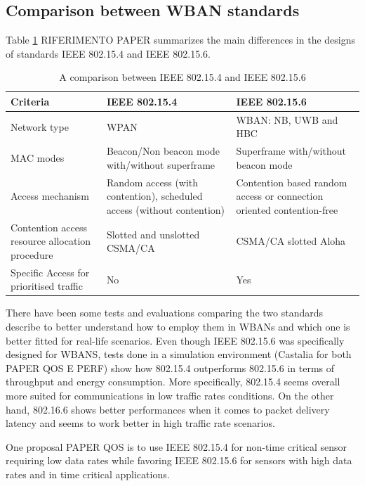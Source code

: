 \documentclass[conference]{IEEEtran}
\begin{document}
\subsection{Comparison between WBAN standards}
Table \ref{tab2} RIFERIMENTO PAPER summarizes the main differences in the designs of standards IEEE 802.15.4 and IEEE 802.15.6.

\begin{table}[htbp]
	\caption{A comparison between IEEE 802.15.4 and IEEE 802.15.6}
	\begin{tabularx}{0.5\textwidth}{X|X|X|}
		\textbf{Criteria} & \textbf{IEEE 802.15.4} & \textbf{IEEE 802.15.6} \\
		\hline
		Network type & WPAN &  WBAN: NB, UWB and HBC\\
		\hline
		MAC modes &  Beacon/Non beacon mode with/without superframe & Superframe with/without beacon mode \\
		\hline
		Access mechanism &  Random access (with contention), scheduled access (without contention) & Contention based random access or connection oriented contention-free \\
		\hline
		Contention access resource allocation procedure	& Slotted and unslotted CSMA/CA & CSMA/CA slotted Aloha \\
		\hline
		Specific Access for prioritised traffic & No & Yes \\
		\hline
	\end{tabularx}
	\label{tab2}
\end{table}

There have been some tests and evaluations comparing the two standards describe to better understand how to employ them in WBANs and which one is better fitted for real-life scenarios. Even though IEEE 802.15.6 was specifically designed for WBANS, tests done in a simulation environment (Castalia for both PAPER QOS E PERF) show how 802.15.4 outperforms 802.15.6 in terms of throughput and energy consumption. More specifically, 802.15.4 seems overall more suited for communications in low traffic rates conditions. On the other hand, 802.16.6 shows better performances when it comes to packet delivery latency and seems to work better in high traffic rate scenarios.

One proposal PAPER QOS is to use IEEE 802.15.4 for non-time critical sensor requiring low data rates while favoring IEEE 802.15.6 for sensors with high data rates and in time critical applications. 
\end{document}
